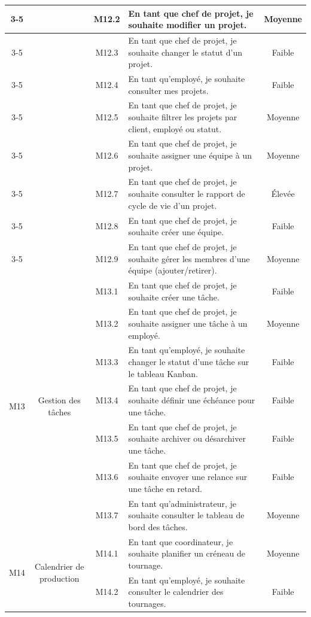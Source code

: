 \begin{longtable}{|c|c|c|p{7.2cm}|c|}
\cline{3-5}
 & & M12.2 & En tant que chef de projet, je souhaite modifier un projet. & Moyenne \\
\cline{3-5}
 & & M12.3 & En tant que chef de projet, je souhaite changer le statut d'un projet. & Faible \\
\cline{3-5}
 & & M12.4 & En tant qu'employé, je souhaite consulter mes projets. & Faible \\
\cline{3-5}
 & & M12.5 & En tant que chef de projet, je souhaite filtrer les projets par client, employé ou statut. & Moyenne \\
\cline{3-5}
 & & M12.6 & En tant que chef de projet, je souhaite assigner une équipe à un projet. & Moyenne \\
\cline{3-5}
 & & M12.7 & En tant que chef de projet, je souhaite consulter le rapport de cycle de vie d'un projet. & Élevée \\
\cline{3-5}
 & & M12.8 & En tant que chef de projet, je souhaite créer une équipe. & Faible \\
\cline{3-5}
 & & M12.9 & En tant que chef de projet, je souhaite gérer les membres d'une équipe (ajouter/retirer). & Moyenne \\
\hline
\multirow{7}{*}{M13} & \multirow{7}{*}{Gestion des tâches} & M13.1 & En tant que chef de projet, je souhaite créer une tâche. & Faible \\
\cline{3-5}
 & & M13.2 & En tant que chef de projet, je souhaite assigner une tâche à un employé. & Moyenne \\
\cline{3-5}
 & & M13.3 & En tant qu'employé, je souhaite changer le statut d'une tâche sur le tableau Kanban. & Faible \\
\cline{3-5}
 & & M13.4 & En tant que chef de projet, je souhaite définir une échéance pour une tâche. & Faible \\
\cline{3-5}
 & & M13.5 & En tant que chef de projet, je souhaite archiver ou désarchiver une tâche. & Faible \\
\cline{3-5}
 & & M13.6 & En tant que chef de projet, je souhaite envoyer une relance sur une tâche en retard. & Faible \\
\cline{3-5}
 & & M13.7 & En tant qu'administrateur, je souhaite consulter le tableau de bord des tâches. & Moyenne \\
\hline
\multirow{4}{*}{M14} & \multirow{4}{*}{Calendrier de production} & M14.1 & En tant que coordinateur, je souhaite planifier un créneau de tournage. & Moyenne \\
\cline{3-5}
 & & M14.2 & En tant qu'employé, je souhaite consulter le calendrier des tournages. & Faible \\

\end{longtable}
